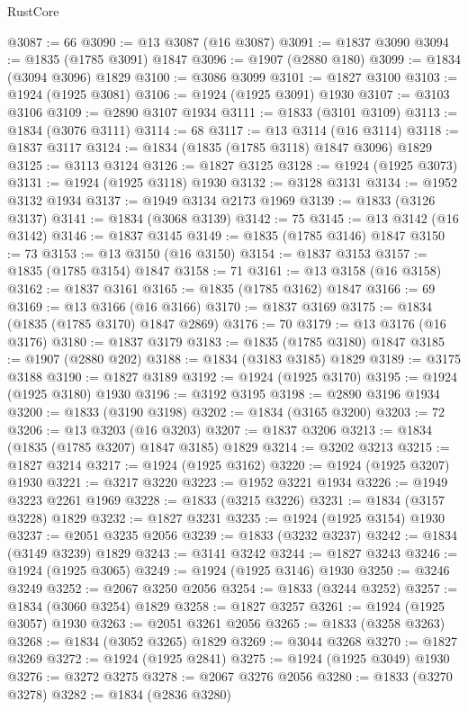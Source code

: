 \begin{lexlean}{RustCore}
\begin{coremodule}
@3087 := 66
@3090 := @13 @3087 (@16 @3087)
@3091 := @1837 @3090
@3094 := @1835 (@1785 @3091) @1847
@3096 := @1907 (@2880 @180)
@3099 := @1834 (@3094 @3096) @1829
@3100 := @3086 @3099
@3101 := @1827 @3100
@3103 := @1924 (@1925 @3081)
@3106 := @1924 (@1925 @3091) @1930
@3107 := @3103 @3106
@3109 := @2890 @3107 @1934
@3111 := @1833 (@3101 @3109)
@3113 := @1834 (@3076 @3111)
@3114 := 68
@3117 := @13 @3114 (@16 @3114)
@3118 := @1837 @3117
@3124 := @1834 (@1835 (@1785 @3118) @1847 @3096) @1829
@3125 := @3113 @3124
@3126 := @1827 @3125
@3128 := @1924 (@1925 @3073)
@3131 := @1924 (@1925 @3118) @1930
@3132 := @3128 @3131
@3134 := @1952 @3132 @1934
@3137 := @1949 @3134 @2173 @1969
@3139 := @1833 (@3126 @3137)
@3141 := @1834 (@3068 @3139)
@3142 := 75
@3145 := @13 @3142 (@16 @3142)
@3146 := @1837 @3145
@3149 := @1835 (@1785 @3146) @1847
@3150 := 73
@3153 := @13 @3150 (@16 @3150)
@3154 := @1837 @3153
@3157 := @1835 (@1785 @3154) @1847
@3158 := 71
@3161 := @13 @3158 (@16 @3158)
@3162 := @1837 @3161
@3165 := @1835 (@1785 @3162) @1847
@3166 := 69
@3169 := @13 @3166 (@16 @3166)
@3170 := @1837 @3169
@3175 := @1834 (@1835 (@1785 @3170) @1847 @2869)
@3176 := 70
@3179 := @13 @3176 (@16 @3176)
@3180 := @1837 @3179
@3183 := @1835 (@1785 @3180) @1847
@3185 := @1907 (@2880 @202)
@3188 := @1834 (@3183 @3185) @1829
@3189 := @3175 @3188
@3190 := @1827 @3189
@3192 := @1924 (@1925 @3170)
@3195 := @1924 (@1925 @3180) @1930
@3196 := @3192 @3195
@3198 := @2890 @3196 @1934
@3200 := @1833 (@3190 @3198)
@3202 := @1834 (@3165 @3200)
@3203 := 72
@3206 := @13 @3203 (@16 @3203)
@3207 := @1837 @3206
@3213 := @1834 (@1835 (@1785 @3207) @1847 @3185) @1829
@3214 := @3202 @3213
@3215 := @1827 @3214
@3217 := @1924 (@1925 @3162)
@3220 := @1924 (@1925 @3207) @1930
@3221 := @3217 @3220
@3223 := @1952 @3221 @1934
@3226 := @1949 @3223 @2261 @1969
@3228 := @1833 (@3215 @3226)
@3231 := @1834 (@3157 @3228) @1829
@3232 := @1827 @3231
@3235 := @1924 (@1925 @3154) @1930
@3237 := @2051 @3235 @2056
@3239 := @1833 (@3232 @3237)
@3242 := @1834 (@3149 @3239) @1829
@3243 := @3141 @3242
@3244 := @1827 @3243
@3246 := @1924 (@1925 @3065)
@3249 := @1924 (@1925 @3146) @1930
@3250 := @3246 @3249
@3252 := @2067 @3250 @2056
@3254 := @1833 (@3244 @3252)
@3257 := @1834 (@3060 @3254) @1829
@3258 := @1827 @3257
@3261 := @1924 (@1925 @3057) @1930
@3263 := @2051 @3261 @2056
@3265 := @1833 (@3258 @3263)
@3268 := @1834 (@3052 @3265) @1829
@3269 := @3044 @3268
@3270 := @1827 @3269
@3272 := @1924 (@1925 @2841)
@3275 := @1924 (@1925 @3049) @1930
@3276 := @3272 @3275
@3278 := @2067 @3276 @2056
@3280 := @1833 (@3270 @3278)
@3282 := @1834 (@2836 @3280)

\end{coremodule}
\end{lexlean}
